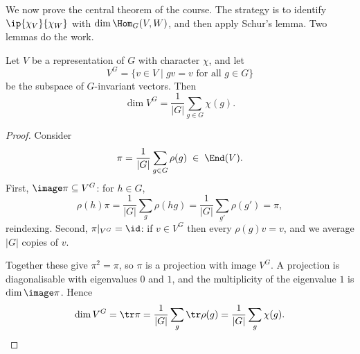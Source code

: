 We now prove the central theorem of the course. The strategy is to identify $\ip{\chi_V}{\chi_W}$ with $\dim \Hom_G(V,W)$, and then apply Schur's lemma. Two lemmas do the work.

\begin{lemma}
	Let $V$ be a representation of $G$ with character $\chi$, and let
	$$V^G = \{ v \in V \mid gv = v \text{ for all } g \in G\}$$
	be the subspace of $G$-invariant vectors. Then
	$$\dim V^G = \frac{1}{|G|}\sum_{g\in G}\chi(g).$$
\end{lemma}
\begin{proof}
	Consider
	$$\pi = \frac1{|G|}\sum_{g \in G}\rho(g) \; \in \; \End(V).$$
	First, $\image \pi \subseteq V^G$: for $h \in G$,
	$$\rho(h)\pi = \frac1{|G|}\sum_{g}\rho(hg) = \frac1{|G|}\sum_{g'}\rho(g') = \pi,$$
	reindexing. Second, $\pi|_{V^G} = \id$: if $v \in V^G$ then every $\rho(g)v = v$, and we average $|G|$ copies of $v$.

	Together these give $\pi^2 = \pi$, so $\pi$ is a projection with image $V^G$. A projection is diagonalisable with eigenvalues $0$ and $1$, and the multiplicity of the eigenvalue $1$ is $\dim \image \pi$. Hence
	$$\dim V^G = \tr \pi = \frac1{|G|}\sum_g \tr\rho(g) = \frac1{|G|}\sum_g \chi(g). \qedhere$$
\end{proof}

